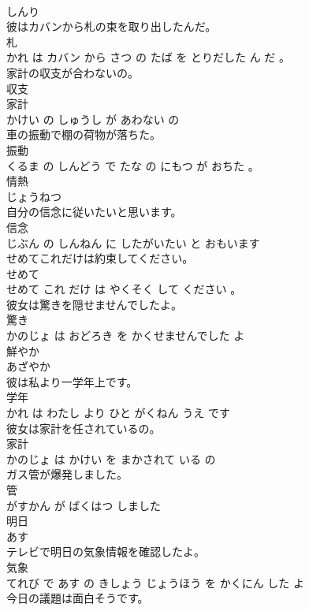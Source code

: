 \documentclass[8pt]{extreport}
\begin{document}
\begin{CJK}{UTF8}{min}
\\	しんり		
\\	彼はカバンから札の束を取り出したんだ。	
\\	札 
\\	かれ は カバン から さつ の たば を とりだした ん だ 。			
\\	家計の収支が合わないの。	
\\	収支 
\\	家計 
\\	かけい の しゅうし が あわない の			
\\	車の振動で棚の荷物が落ちた。	
\\	振動 
\\	くるま の しんどう で たな の にもつ が おちた 。			
\\	情熱	
\\	じょうねつ		
\\	自分の信念に従いたいと思います。	
\\	信念 
\\	じぶん の しんねん に したがいたい と おもいます			
\\	せめてこれだけは約束してください。	
\\	せめて 
\\	せめて これ だけ は やくそく して ください 。			
\\	彼女は驚きを隠せませんでしたよ。	
\\	驚き 
\\	かのじょ は おどろき を かくせませんでした よ			
\\	鮮やか	
\\	あざやか		
\\	彼は私より一学年上です。	
\\	学年 
\\	かれ は わたし より ひと がくねん うえ です			
\\	彼女は家計を任されているの。	
\\	家計 
\\	かのじょ は かけい を まかされて いる の			
\\	ガス管が爆発しました。	
\\	管 
\\	がすかん が ばくはつ しました			
\\	明日	
\\	あす		
\\	テレビで明日の気象情報を確認したよ。	
\\	気象 
\\	てれび で あす の きしょう じょうほう を かくにん した よ			
\\	今日の議題は面白そうです。	

\end{CJK}
\end{document}
